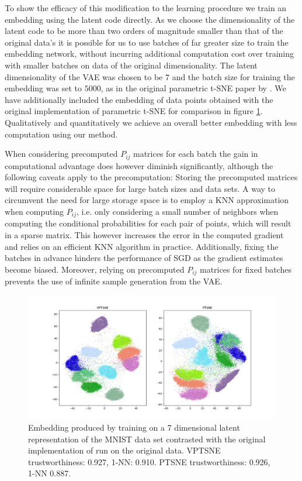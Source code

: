 To show the efficacy of this modification to the learning procedure we train an embedding using the latent code directly. As we choose the dimensionality of the latent code to be more than two orders of magnitude smaller than that of the original data's it is possible for us to use batches of far greater size to train the embedding network, without incurring additional computation cost over training with smaller batches on data of the original dimensionality. The latent dimensionality of the VAE was chosen to be $7$ and the batch size for training the embedding was set to $5000$, as in the original parametric t-SNE paper by \cite{parametric_tsne}. We have additionally included the embedding of data points obtained with the original implementation of parametric t-SNE for comparison in figure \ref{fig:hidden_layer}. Qualitatively and quantitatively we achieve an overall better embedding with less computation using our method.

When considering precomputed $P_{ij}$ matrices for each batch the gain in computational advantage does however diminish significantly, although the following caveats apply to the precomputation: Storing the precomputed matrices will require considerable space for large batch sizes and data sets. A way to circumvent the need for large storage space is to employ a KNN approximation when computing $P_{ij}$, i.e. only considering a small number of neighbors when computing the conditional probabilities for each pair of points, which will result in a sparse matrix. This however increases the error in the computed gradient and relies on an efficient KNN algorithm in practice. Additionally, fixing the batches in advance hinders the performance of SGD as the gradient estimates become biased. Moreover, relying on precomputed $P_{ij}$ matrices for fixed batches prevents the use of infinite sample generation from the VAE.

\begin{figure}[!htb]
  \centering
  \includegraphics[width=\textwidth]{images/vptsne_vs_original_ptsne_7.png}
  \caption{Embedding produced by training on a 7 dimensional latent representation of the MNIST data set contrasted with the original implementation of \cite{parametric_tsne} run on the original data. VPTSNE trustworthiness: 0.927, 1-NN: 0.910. PTSNE trustworthiness: 0.926, 1-NN 0.887.}
  \label{fig:hidden_layer}
\end{figure}

